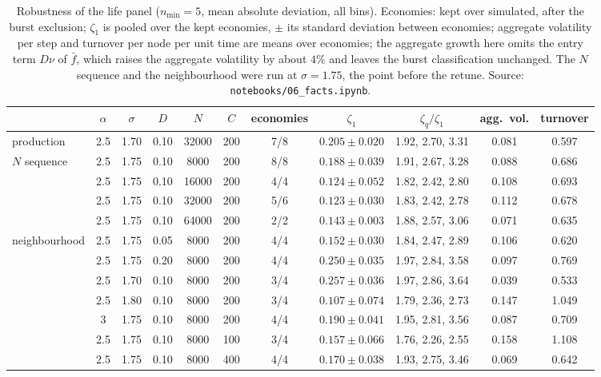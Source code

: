 \documentclass[pre,onecolumn,superscriptaddress,nofootinbib]{revtex4-2}
\begin{document}
\begin{table}[h]
\caption{Robustness of the life panel ($n_{\min}=5$, mean absolute deviation, all bins).  Economies: kept
over simulated, after the burst exclusion; $\zeta_1$ is pooled over the kept economies, $\pm$ its standard
deviation between economies; aggregate volatility per step and turnover per node per unit time are
means over economies; the aggregate growth here omits the entry term $D\nu$ of $\bar f$, which raises the aggregate
volatility by about $4\%$ and leaves the burst classification unchanged.  The $N$ sequence and the neighbourhood were run at $\sigma=1.75$, the point
before the retune.  Source: \texttt{notebooks/06\_facts.ipynb}.}
\label{tab:robust}
\begin{ruledtabular}
\begin{tabular}{lcccccccccc}
 & $\alpha$ & $\sigma$ & $D$ & $N$ & $C$ & economies & $\zeta_1$ & $\zeta_q/\zeta_1$ & agg.\ vol. & turnover\\
\hline
production & 2.5 & 1.70 & 0.10 & 32000 & 200 & 7/8 & $0.205\pm0.020$ & 1.92, 2.70, 3.31 & 0.081 & 0.597\\
\hline
$N$ sequence & 2.5 & 1.75 & 0.10 & 8000 & 200 & 8/8 & $0.188\pm0.039$ & 1.91, 2.67, 3.28 & 0.088 & 0.686\\
 & 2.5 & 1.75 & 0.10 & 16000 & 200 & 4/4 & $0.124\pm0.052$ & 1.82, 2.42, 2.80 & 0.108 & 0.693\\
 & 2.5 & 1.75 & 0.10 & 32000 & 200 & 5/6 & $0.123\pm0.030$ & 1.83, 2.42, 2.78 & 0.112 & 0.678\\
 & 2.5 & 1.75 & 0.10 & 64000 & 200 & 2/2 & $0.143\pm0.003$ & 1.88, 2.57, 3.06 & 0.071 & 0.635\\
\hline
neighbourhood & 2.5 & 1.75 & 0.05 & 8000 & 200 & 4/4 & $0.152\pm0.030$ & 1.84, 2.47, 2.89 & 0.106 & 0.620\\
 & 2.5 & 1.75 & 0.20 & 8000 & 200 & 4/4 & $0.250\pm0.035$ & 1.97, 2.84, 3.58 & 0.097 & 0.769\\
 & 2.5 & 1.70 & 0.10 & 8000 & 200 & 3/4 & $0.257\pm0.036$ & 1.97, 2.86, 3.64 & 0.039 & 0.533\\
 & 2.5 & 1.80 & 0.10 & 8000 & 200 & 3/4 & $0.107\pm0.074$ & 1.79, 2.36, 2.73 & 0.147 & 1.049\\
 & 3 & 1.75 & 0.10 & 8000 & 200 & 4/4 & $0.190\pm0.041$ & 1.95, 2.81, 3.56 & 0.087 & 0.709\\
 & 2.5 & 1.75 & 0.10 & 8000 & 100 & 3/4 & $0.157\pm0.066$ & 1.76, 2.26, 2.55 & 0.158 & 1.108\\
 & 2.5 & 1.75 & 0.10 & 8000 & 400 & 4/4 & $0.170\pm0.038$ & 1.93, 2.75, 3.46 & 0.069 & 0.642\\

\end{tabular}
\end{ruledtabular}
\end{table}
\end{document}
